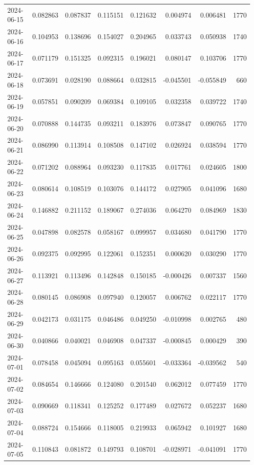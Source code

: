 \begin{tabular}{lrrrrrrr}
2024-06-15 & 0.082863 & 0.087837 & 0.115151 & 0.121632 & 0.004974 & 0.006481 & 1770 \\
2024-06-16 & 0.104953 & 0.138696 & 0.154027 & 0.204965 & 0.033743 & 0.050938 & 1740 \\
2024-06-17 & 0.071179 & 0.151325 & 0.092315 & 0.196021 & 0.080147 & 0.103706 & 1770 \\
2024-06-18 & 0.073691 & 0.028190 & 0.088664 & 0.032815 & -0.045501 & -0.055849 & 660 \\
2024-06-19 & 0.057851 & 0.090209 & 0.069384 & 0.109105 & 0.032358 & 0.039722 & 1740 \\
2024-06-20 & 0.070888 & 0.144735 & 0.093211 & 0.183976 & 0.073847 & 0.090765 & 1770 \\
2024-06-21 & 0.086990 & 0.113914 & 0.108508 & 0.147102 & 0.026924 & 0.038594 & 1770 \\
2024-06-22 & 0.071202 & 0.088964 & 0.093230 & 0.117835 & 0.017761 & 0.024605 & 1800 \\
2024-06-23 & 0.080614 & 0.108519 & 0.103076 & 0.144172 & 0.027905 & 0.041096 & 1680 \\
2024-06-24 & 0.146882 & 0.211152 & 0.189067 & 0.274036 & 0.064270 & 0.084969 & 1830 \\
2024-06-25 & 0.047898 & 0.082578 & 0.058167 & 0.099957 & 0.034680 & 0.041790 & 1770 \\
2024-06-26 & 0.092375 & 0.092995 & 0.122061 & 0.152351 & 0.000620 & 0.030290 & 1770 \\
2024-06-27 & 0.113921 & 0.113496 & 0.142848 & 0.150185 & -0.000426 & 0.007337 & 1560 \\
2024-06-28 & 0.080145 & 0.086908 & 0.097940 & 0.120057 & 0.006762 & 0.022117 & 1770 \\
2024-06-29 & 0.042173 & 0.031175 & 0.046486 & 0.049250 & -0.010998 & 0.002765 & 480 \\
2024-06-30 & 0.040866 & 0.040021 & 0.046908 & 0.047337 & -0.000845 & 0.000429 & 390 \\
2024-07-01 & 0.078458 & 0.045094 & 0.095163 & 0.055601 & -0.033364 & -0.039562 & 540 \\
2024-07-02 & 0.084654 & 0.146666 & 0.124080 & 0.201540 & 0.062012 & 0.077459 & 1770 \\
2024-07-03 & 0.090669 & 0.118341 & 0.125252 & 0.177489 & 0.027672 & 0.052237 & 1680 \\
2024-07-04 & 0.088724 & 0.154666 & 0.118005 & 0.219933 & 0.065942 & 0.101927 & 1680 \\
2024-07-05 & 0.110843 & 0.081872 & 0.149793 & 0.108701 & -0.028971 & -0.041091 & 1770 \\

\end{tabular}
